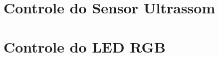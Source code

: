 \begin{apendicesenv}

\partapendices

\chapter{Controle do Sensor Ultrassom}



\chapter{Controle do LED RGB}



\end{apendicesenv}


